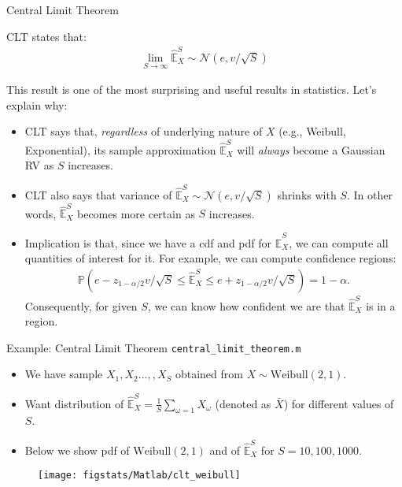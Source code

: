 \documentclass[9pt]{beamer}
\begin{document}
%
\begin{frame}{Central Limit Theorem}

\begin{block}{}
CLT states that:
\begin{align*}
\lim_{S\to \infty}\hat{\mathbb{E}}_X^S\sim \mathcal{N}(e,v/\sqrt{S})
\end{align*}
\end{block}

This result is one of the most surprising and useful results in statistics. Let's explain why:

\begin{itemize}
\setlength{\itemsep}{10pt}
\item CLT says that, {\em regardless} of underlying nature of $X$ (e.g., Weibull, Exponential), its sample approximation $\hat{\mathbb{E}}_X^S$ will {\em always} become a Gaussian RV as $S$ increases.  

\item CLT also says that variance of $\hat{\mathbb{E}}_X^S\sim \mathcal{N}(e,v/\sqrt{S})$ shrinks with $S$. In other words, $\hat{\mathbb{E}}_X^S$ becomes more certain as $S$ increases.

\item Implication is that, since we have a cdf and pdf for $\hat{\mathbb{E}}_X^S$, we can compute all quantities of interest for it. For example, we can compute confidence regions:
\begin{align*}
\mathbb{P}\left(e-z_{1-\alpha/2}v/\sqrt{S}\leq \hat{\mathbb{E}}_X^S\leq e+z_{1-\alpha/2}v/\sqrt{S}\right)=1-\alpha.
\end{align*}
Consequently, for given $S$, we can know how confident we are that $\hat{\mathbb{E}}_X^S$ is in a region.  

\end{itemize}


\end{frame}

%
\begin{frame}{Example: Central Limit Theorem \footnotesize{\texttt{central\_limit\_theorem.m}}}

\begin{itemize}
\setlength{\itemsep}{5pt}
\item We have sample $X_1,X_2...,,X_S$ obtained from $X\sim \textrm{Weibull}(2,1)$.
\item Want distribution of $\hat{\mathbb{E}}_X^S=\frac{1}{S}\sum_{\omega=1}X_\omega$ (denoted as $\bar{X}$) for different values of $S$.
\item Below we show pdf of $\textrm{Weibull}(2,1)$ and of $\hat{\mathbb{E}}_X^S$ for $S=10,100,1000$.
\end{itemize}
\begin{figure}[!htb]
    \centering
	\texttt{[image: figstats/Matlab/clt\_weibull]}
\end{figure}
\end{frame}
\end{document}
